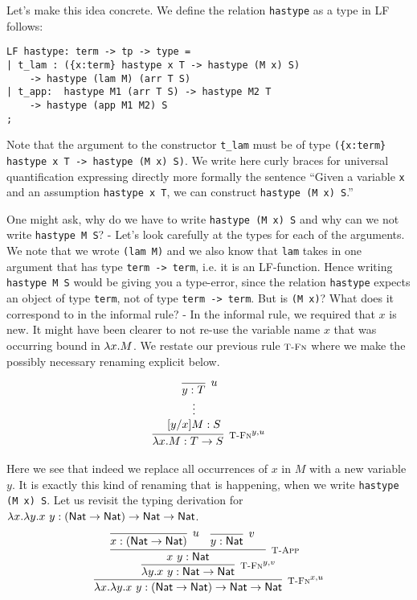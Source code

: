 Let's make this idea concrete. We define the relation \lstinline!hastype! as
a type in LF follows:

\begin{lstlisting}
LF hastype: term -> tp -> type =
| t_lam : ({x:term} hastype x T -> hastype (M x) S)
	-> hastype (lam M) (arr T S)
| t_app:  hastype M1 (arr T S) -> hastype M2 T
	-> hastype (app M1 M2) S
;
\end{lstlisting}

Note that the argument to the constructor \lstinline!t_lam! must be of type
\lstinline!({x:term} hastype x T -> hastype (M x) S)!. We write here curly braces
for universal quantification expressing directly more formally the sentence
``Given a variable \lstinline!x! and an assumption \lstinline!hastype x T!, we can
construct \lstinline!hastype (M x) S!.''

One might ask, why do we have to write \lstinline!hastype (M x) S! and why can
we not write \lstinline!hastype M S!? - Let's look carefully at the types for
each of the arguments. We note that we wrote \lstinline!(lam M)! and we also
know that \lstinline!lam! takes in one argument that has type
\lstinline!term -> term!, i.e. it is an LF-function. Hence writing \lstinline!hastype M S! would be
giving you a type-error, since the relation \lstinline!hastype! expects an
object of type \lstinline!term!, not of type \lstinline!term -> term!.
But is \lstinline!(M x)!? What does it correspond to in the informal rule? - In the
informal rule, we required that $x$ is new. It might have been clearer to not
re-use the variable name $x$ that was occurring bound in $\lambda
x.M$. We restate our previous rule $\textsc{\footnotesize T-Fn}$ where we make the possibly necessary
renaming explicit below.

\[
\begin{array}{c}
\infer[\TFn^{y,u}]{\lam x.M : T \arrow S}
                 {\hypo{\quad\infer[u]{y:T}{}}{[y/x]M:S}}
\end{array}
\]

Here we see that indeed we replace all occurrences of $x$ in $M$ with a new
variable $y$. It is exactly this kind of renaming that is happening, when we
write \lstinline!hastype (M x) S!.
Let us revisit the typing derivation for $\lambda x.\lambda y.x~y : (\textsf{Nat} \rightarrow
\textsf{Nat}) \rightarrow \textsf{Nat} \rightarrow \textsf{Nat}$.
\[
\infer[\TFn^{x,u}]{\lam x.\lam y.x~y : (\Nat \arrow \Nat) \arrow \Nat \arrow \Nat}
 {\infer[\TFn^{y,v}]{\lam y.x~y :  \Nat  \arrow \Nat}
           {\infer[\TApp]{x~y :\Nat}
                      {\infer[u]{x: (\Nat \arrow \Nat) }{} &
                        \infer[v]{ y: \Nat }{} &
                      }
                    }
                  }
\]

